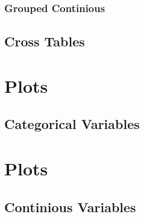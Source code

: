 \documentclass[]{article}
\begin{document}
\hypertarget{grouped-continious}{%
\subsubsection{Grouped Continious}\label{grouped-continious}}

\pagebreak

\newpage
\begin{landscape}

\hypertarget{cross-tables}{%
\section{Cross Tables}\label{cross-tables}}

\end{landscape}

\hypertarget{plots}{%
\section{Plots}\label{plots}}

\hypertarget{categorical-variables-1}{%
\subsection{Categorical Variables}\label{categorical-variables-1}}

\hypertarget{plots-1}{%
\section{Plots}\label{plots-1}}

\hypertarget{continious-variables-1}{%
\subsection{Continious Variables}\label{continious-variables-1}}
\end{document}
